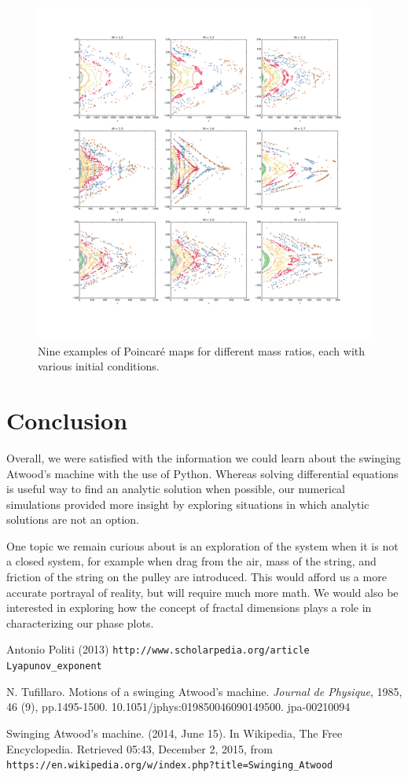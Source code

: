 \documentclass{article}
\begin{document}
\begin{figure}
\centering
\includegraphics[width=\textwidth]{nine_plots}
\caption{Nine examples of Poincar\'e maps for different mass ratios, each with various initial conditions.}
\label{nine_plots}
\end{figure}

\section*{Conclusion}

Overall, we were satisfied with the information we could learn about the swinging Atwood's machine with the use of Python.  Whereas solving differential equations is useful way to find an analytic solution when possible, our numerical simulations provided more insight by exploring situations in which analytic solutions are not an option.  

One topic we remain curious about is an exploration of the system when it is not a closed system, for example when drag from the air, mass of the string, and friction of the string on the pulley are introduced.  This would afford us a more accurate portrayal of reality, but will require much more math.  We would also be interested in exploring how the concept of fractal dimensions plays a role in characterizing our phase plots.

\begin{thebibliography}{9}
Antonio Politi (2013) \texttt{http://www.scholarpedia.org/article Lyapunov\_exponent}
 
N. Tufillaro. Motions of a swinging Atwood's machine. \textit{Journal de Physique}, 1985, 46 (9),
	pp.1495-1500. 10.1051/jphys:019850046090149500. jpa-00210094
 
Swinging Atwood's machine. (2014, June 15). In Wikipedia, The Free Encyclopedia. Retrieved 05:43, 	December 2, 2015, from \texttt{https://en.wikipedia.org/w/index.php?title=Swinging\_Atwood}

\end{thebibliography}
\end{document}

